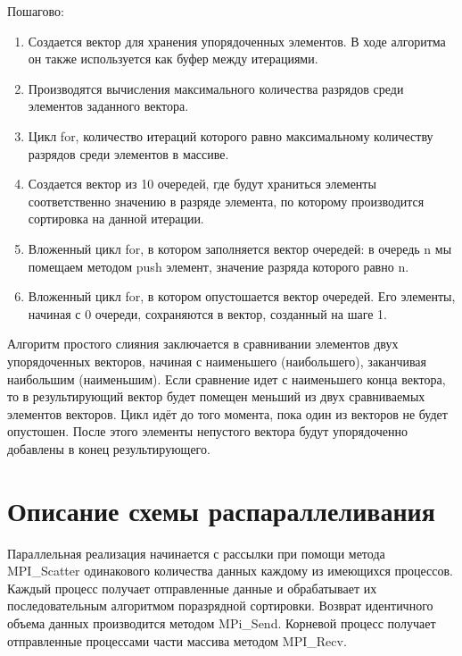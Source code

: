 \documentclass{report}
\begin{document}
Пошагово:
\begin{enumerate} 
\item Создается вектор для хранения упорядоченных элементов. В ходе алгоритма он также используется как буфер между итерациями.
\item Производятся вычисления максимального количества разрядов среди элементов заданного вектора.
\item Цикл for, количество итераций которого равно максимальному количеству разрядов среди элементов в массиве.
\item Создается вектор из 10 очередей, где будут храниться элементы соответственно значению в разряде элемента, по которому производится сортировка на данной итерации.
\item Вложенный цикл for, в котором заполняется вектор очередей: в очередь n мы помещаем методом push элемент, значение разряда которого равно n.
\item Вложенный цикл for, в котором опустошается вектор очередей. Его элементы, начиная с 0 очереди, сохраняются в вектор, созданный на шаге 1.
\end{enumerate}
Алгоритм простого слияния заключается в сравнивании элементов двух упорядоченных векторов, начиная с наименьшего (наибольшего), заканчивая наибольшим (наименьшим). Если сравнение идет с наименьшего конца вектора, то в результирующий вектор будет помещен меньший из двух сравниваемых элементов векторов. Цикл идёт до того момента, пока один из векторов не будет опустошен.
После этого элементы непустого вектора будут упорядоченно добавлены в конец результирующего.
\newpage
\section*{Описание схемы распараллеливания}
\par 
Параллельная реализация начинается с рассылки при помощи метода MPI\_Scatter одинакового количества данных каждому из имеющихся процессов. Каждый процесс получает отправленные данные и обрабатывает их последовательным алгоритмом поразрядной сортировки.
Возврат идентичного объема данных производится методом MPi\_Send. Корневой процесс получает отправленные процессами части массива методом MPI\_Recv. 
\newpage
\end{document}
